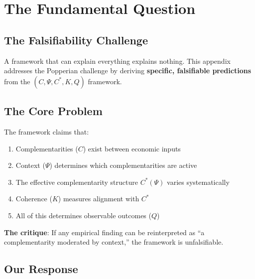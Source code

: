 
\section{The Fundamental Question}
\label{sec:S-fundamental}

\subsection{The Falsifiability Challenge}

A framework that can explain everything explains nothing. This appendix addresses the Popperian challenge by deriving \textbf{specific, falsifiable predictions} from the $(C, \Psi, C^*, K, Q)$ framework.

\subsection{The Core Problem}

The framework claims that:
\begin{enumerate}
    \item Complementarities ($C$) exist between economic inputs
    \item Context ($\Psi$) determines which complementarities are active
    \item The effective complementarity structure $C^*(\Psi)$ varies systematically
    \item Coherence ($K$) measures alignment with $C^*$
    \item All of this determines observable outcomes ($Q$)
\end{enumerate}

\begin{tcolorbox}[colback=red!5!white, colframe=red!75!black,
    title=The Fundamental Question]
\textbf{The critique}: If any empirical finding can be reinterpreted as ``a complementarity moderated by context,'' the framework is unfalsifiable.
\end{tcolorbox}

\subsection{Our Response}

